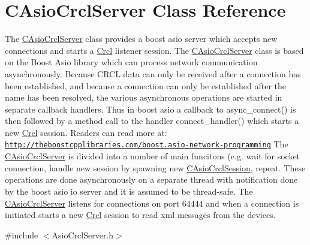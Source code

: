 \hypertarget{classCAsioCrclServer}{\section{C\-Asio\-Crcl\-Server Class Reference}
\label{classCAsioCrclServer}
}


The \hyperlink{classCAsioCrclServer}{C\-Asio\-Crcl\-Server} class provides a boost asio server which accepts new connections and starts a \hyperlink{namespaceCrcl}{Crcl} listener session. The \hyperlink{classCAsioCrclServer}{C\-Asio\-Crcl\-Server} class is based on the Boost Asio library which can process network communication asynchronously. Because C\-R\-C\-L data can only be received after a connection has been established, and because a connection can only be established after the name has been resolved, the various asynchronous operations are started in separate callback handlers. Thus in boost asio a callback to async\-\_\-connect() is then followed by a method call to the handler connect\-\_\-handler() which starts a new \hyperlink{namespaceCrcl}{Crcl} session. Readers can read more at\-: \href{http://theboostcpplibraries.com/boost.asio-network-programming}{\tt http\-://theboostcpplibraries.\-com/boost.\-asio-\/network-\/programming} The \hyperlink{classCAsioCrclServer}{C\-Asio\-Crcl\-Server} is divided into a number of main funcitons (e.\-g. wait for socket connection, handle new session by spawning new \hyperlink{classCAsioCrclSession}{C\-Asio\-Crcl\-Session}, repeat. These operations are done asynchronously on a separate thread with notification done by the boost asio io server and it is assumed to be thread-\/safe. The \hyperlink{classCAsioCrclServer}{C\-Asio\-Crcl\-Server} listens for connections on port 64444 and when a connection is initiated starts a new \hyperlink{namespaceCrcl}{Crcl} session to read xml messages from the devices.  




{\ttfamily \#include $<$Asio\-Crcl\-Server.\-h$>$}

